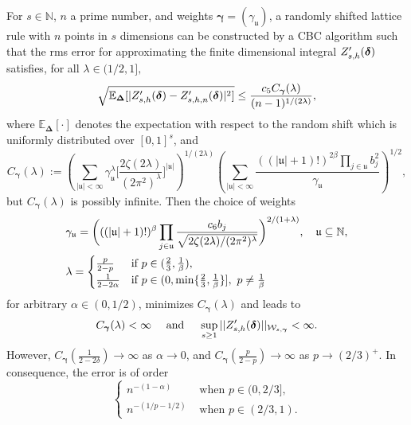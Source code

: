 \documentclass[graybox]{svmult}
\begin{document}
\begin{theorem} \label{thm: weights}
For $s \in \mathbb{N}$, $n$ a prime number, and weights $\boldsymbol{\gamma} = (\gamma_{\mathfrak{u}})$, a randomly shifted lattice rule with $n$ points in $s$ dimensions can be constructed by a CBC algorithm such that the rms error for approximating the finite dimensional integral $Z_{s,h}'({\boldsymbol{\delta}})$ satisfies, for all $\lambda \in (1/2, 1],$
    \begin{equation*}
        \sqrt{\mathbb{E}_{\boldsymbol{\Delta}}[|Z_{s,h}'({\boldsymbol{\delta}}) - Z_{s,h,n}'({\boldsymbol{\delta}})|^2]} \leq \frac{c_5 C_{\boldsymbol{\gamma}}(\lambda)}{(n-1)^{1/(2\lambda)}},
    \end{equation*}
    where $\mathbb{E}_{\boldsymbol{\Delta}}[\cdot]$ denotes the expectation with respect to the random shift which is uniformly distributed over $[0,1]^s$, and
    \begin{equation*}
        C_{\boldsymbol{\gamma}}(\lambda) := \left( \sum_{|{\mathfrak{u}}| < \infty} \gamma_{{\mathfrak{u}}}^\lambda \bigg[\frac{2\zeta(2\lambda)}{(2\pi^2)^\lambda}\bigg]^{|{\mathfrak{u}}|} \right)^{1/(2\lambda)}\left( \sum_{|{\mathfrak{u}}| < \infty} \frac{((|{\mathfrak{u}}|+1)!)^{2\beta} \prod_{j \in {\mathfrak{u}}} b_j^2}{\gamma_{{\mathfrak{u}}}} \right)^{1/2},
    \end{equation*}
    but $C_{\boldsymbol{\gamma}}(\lambda)$ is possibly infinite. Then the choice of weights
\begin{align*}
&\gamma_{{\mathfrak{u}}}=\bigg(((|{\mathfrak{u}}|+1)!)^\beta \prod_{j\in{\mathfrak{u}}}\frac{c_{6}b_j}{\sqrt{2\zeta(2\lambda)/(2\pi^2)^\lambda}}\bigg)^{2/(1+\lambda)},\quad{\mathfrak{u}}\subseteq\mathbb N,\\
&\lambda=\begin{cases}
\frac{p}{2-p}&\text{if}~p\in(\tfrac23,\tfrac{1}{\beta}),\\
\frac{1}{2-2\alpha}&\text{if}~p\in(0,\min\{\tfrac23,\tfrac{1}{\beta}\}],~p\neq \tfrac{1}{\beta}
\end{cases}
\end{align*}
for arbitrary $\alpha\in (0,1/2)$, minimizes $C_{\boldsymbol{\gamma}}(\lambda)$ and leads to
    $$
        C_{\boldsymbol{\gamma}}(\lambda) < \infty \hspace{1em} \text{ and } \hspace{1em} \sup_{s \geq 1}|| Z_{s,h}'({\boldsymbol{\delta}}) ||_{\mathcal{W}_{s,\boldsymbol{\gamma}}} < \infty.
    $$
    However, $C_{\boldsymbol{\gamma}}(\frac{1}{2-2\delta}) \to \infty$ as $\alpha \to 0$, and $C_{\boldsymbol{\gamma}}(\frac{p}{2-p}) \to \infty$ as $p \to (2/3)^+$. In consequence, the error is of order
    $$
        \begin{cases}
            n^{-(1-\alpha)} &\text{ when } p \in (0, 2/3], \\
            n^{-(1/p-1/2)} &\text{ when } p \in (2/3, 1).
        \end{cases}
    $$
\end{theorem}
\end{document}
